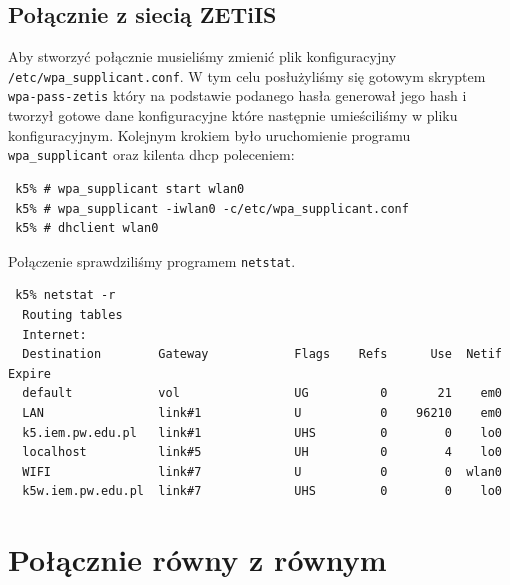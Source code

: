 \documentclass[a4paper,11pt,notitlepage]{article}
\begin{document}
\subsection{Połącznie z siecią ZETiIS}

Aby stworzyć połącznie musieliśmy zmienić plik konfiguracyjny \verb+/etc/wpa_supplicant.conf+. W tym celu posłużyliśmy się gotowym skryptem \verb+wpa-pass-zetis+ 
który na podstawie podanego hasła generował jego hash i tworzył gotowe dane konfiguracyjne które następnie umieściliśmy w pliku konfiguracyjnym.
Kolejnym krokiem było uruchomienie programu \verb+wpa_supplicant+ oraz kilenta dhcp poleceniem:
\begin{verbatim}
 k5% # wpa_supplicant start wlan0
 k5% # wpa_supplicant -iwlan0 -c/etc/wpa_supplicant.conf
 k5% # dhclient wlan0
\end{verbatim}
Połączenie sprawdziliśmy programem \verb+netstat+.
\begin{verbatim}
 k5% netstat -r
  Routing tables
  Internet:
  Destination        Gateway            Flags    Refs      Use  Netif Expire
  default            vol                UG          0       21    em0
  LAN                link#1             U           0    96210    em0
  k5.iem.pw.edu.pl   link#1             UHS         0        0    lo0
  localhost          link#5             UH          0        4    lo0
  WIFI               link#7             U           0        0  wlan0
  k5w.iem.pw.edu.pl  link#7             UHS         0        0    lo0
\end{verbatim}



\section{Połącznie równy z równym}
\end{document}

